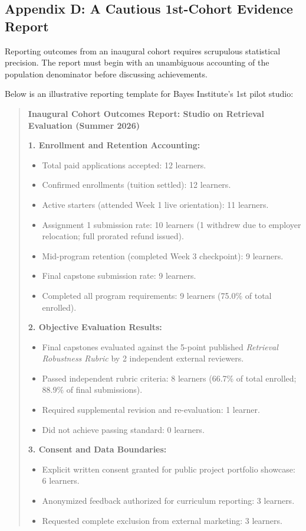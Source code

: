 \subsection*{Appendix D: A Cautious 1st-Cohort Evidence Report}

Reporting outcomes from an inaugural cohort requires scrupulous statistical precision. The report must begin with an unambiguous accounting of the population denominator before discussing achievements.

Below is an illustrative reporting template for Bayes Institute's 1st pilot studio:

\begin{quote}
\textbf{Inaugural Cohort Outcomes Report: Studio on Retrieval Evaluation (Summer 2026)}

\noindent\textbf{1. Enrollment and Retention Accounting:}
\begin{itemize}
\item Total paid applications accepted: 12 learners.
\item Confirmed enrollments (tuition settled): 12 learners.
\item Active starters (attended Week 1 live orientation): 11 learners.
\item Assignment 1 submission rate: 10 learners (1 withdrew due to employer relocation; full prorated refund issued).
\item Mid-program retention (completed Week 3 checkpoint): 9 learners.
\item Final capstone submission rate: 9 learners.
\item Completed all program requirements: 9 learners (75.0\% of total enrolled).
\end{itemize}

\noindent\textbf{2. Objective Evaluation Results:}
\begin{itemize}
\item Final capstones evaluated against the 5-point published \emph{Retrieval Robustness Rubric} by 2 independent external reviewers.
\item Passed independent rubric criteria: 8 learners (66.7\% of total enrolled; 88.9\% of final submissions).
\item Required supplemental revision and re-evaluation: 1 learner.
\item Did not achieve passing standard: 0 learners.
\end{itemize}

\noindent\textbf{3. Consent and Data Boundaries:}
\begin{itemize}
\item Explicit written consent granted for public project portfolio showcase: 6 learners.
\item Anonymized feedback authorized for curriculum reporting: 3 learners.
\item Requested complete exclusion from external marketing: 3 learners.
\end{itemize}


\end{quote}
